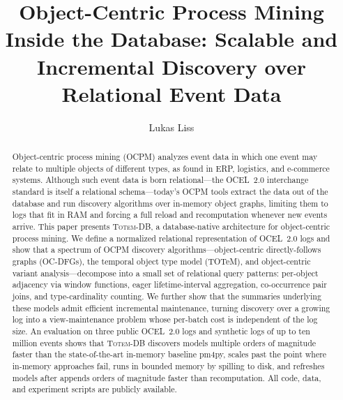 \documentclass[sigconf, nonacm]{acmart}
\newcommand{\sys}{\textsc{Totem-DB}\xspace}
\newcommand{\ocel}{OCEL~2.0\xspace}
\begin{document}
\title{Object-Centric Process Mining Inside the Database: Scalable and Incremental Discovery over Relational Event Data}

\author{Lukas Liss}

\begin{abstract}
Object-centric process mining (OCPM) analyzes event data in which one event may relate to multiple objects of different types, as found in ERP, logistics, and e-commerce systems. Although such event data is born relational---the OCEL~2.0 interchange standard is itself a relational schema---today's OCPM tools extract the data out of the database and run discovery algorithms over in-memory object graphs, limiting them to logs that fit in RAM and forcing a full reload and recomputation whenever new events arrive. This paper presents \sys, a database-native architecture for object-centric process mining. We define a normalized relational representation of \ocel logs and show that a spectrum of OCPM discovery algorithms---object-centric directly-follows graphs (OC-DFGs), the temporal object type model (TOTeM), and object-centric variant analysis---decompose into a small set of relational query patterns: per-object adjacency via window functions, eager lifetime-interval aggregation, co-occurrence pair joins, and type-cardinality counting. We further show that the summaries underlying these models admit efficient incremental maintenance, turning discovery over a growing log into a view-maintenance problem whose per-batch cost is independent of the log size. An evaluation on three public \ocel logs and synthetic logs of up to ten million events shows that \sys discovers models multiple orders of magnitude faster than the state-of-the-art in-memory baseline pm4py, scales past the point where in-memory approaches fail, runs in bounded memory by spilling to disk, and refreshes models after appends orders of magnitude faster than recomputation. All code, data, and experiment scripts are publicly available.
\end{abstract}

\maketitle
\end{document}
